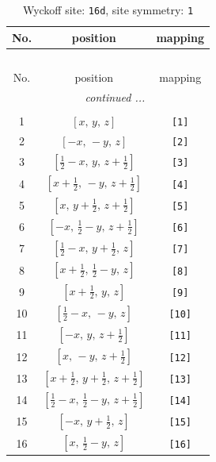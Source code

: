 \documentclass[fleqn,8pt]{jsarticle}
\begin{document}
\begin{longtable}{ccc}
\caption{Wyckoff site: {\tt 16d}, site symmetry: {\tt 1}}
 \\
 \hline \hline
No. & position & mapping \\ \hline \endfirsthead

\multicolumn{2}{l}{\tablename\ \thetable{}} \\
 \hline \hline
No. & position & mapping \\ \hline \endhead

 \hline \hline
\multicolumn{2}{r}{\footnotesize\it continued ...} \\ \endfoot

 \hline \hline
\multicolumn{2}{r}{} \\ \endlastfoot

1 & $\left[ x,\, y,\, z \right]$ & {\tt [1]} \\ \hline
2 & $\left[ - x,\, - y,\, z \right]$ & {\tt [2]} \\ \hline
3 & $\left[ \frac{1}{2} - x,\, y,\, z + \frac{1}{2} \right]$ & {\tt [3]} \\ \hline
4 & $\left[ x + \frac{1}{2},\, - y,\, z + \frac{1}{2} \right]$ & {\tt [4]} \\ \hline
5 & $\left[ x,\, y + \frac{1}{2},\, z + \frac{1}{2} \right]$ & {\tt [5]} \\ \hline
6 & $\left[ - x,\, \frac{1}{2} - y,\, z + \frac{1}{2} \right]$ & {\tt [6]} \\ \hline
7 & $\left[ \frac{1}{2} - x,\, y + \frac{1}{2},\, z \right]$ & {\tt [7]} \\ \hline
8 & $\left[ x + \frac{1}{2},\, \frac{1}{2} - y,\, z \right]$ & {\tt [8]} \\ \hline
9 & $\left[ x + \frac{1}{2},\, y,\, z \right]$ & {\tt [9]} \\ \hline
10 & $\left[ \frac{1}{2} - x,\, - y,\, z \right]$ & {\tt [10]} \\ \hline
11 & $\left[ - x,\, y,\, z + \frac{1}{2} \right]$ & {\tt [11]} \\ \hline
12 & $\left[ x,\, - y,\, z + \frac{1}{2} \right]$ & {\tt [12]} \\ \hline
13 & $\left[ x + \frac{1}{2},\, y + \frac{1}{2},\, z + \frac{1}{2} \right]$ & {\tt [13]} \\ \hline
14 & $\left[ \frac{1}{2} - x,\, \frac{1}{2} - y,\, z + \frac{1}{2} \right]$ & {\tt [14]} \\ \hline
15 & $\left[ - x,\, y + \frac{1}{2},\, z \right]$ & {\tt [15]} \\ \hline
16 & $\left[ x,\, \frac{1}{2} - y,\, z \right]$ & {\tt [16]} \\
\end{longtable}
\end{document}
